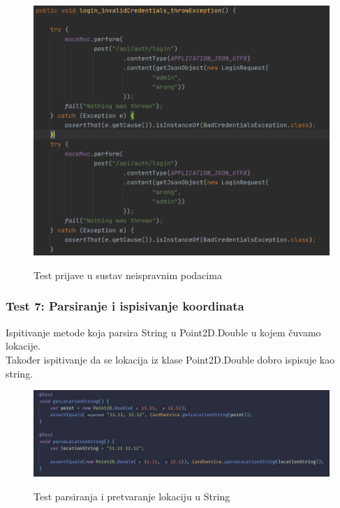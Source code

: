			\begin{figure}[H]
				\centering
				\includegraphics[scale=0.75]{slike/test6} \\
				\caption{ Test prijave u sustav neispravnim podacima}
				\label{fig:test6}
			\end{figure}
		
			\eject
		
			\subsubsection{Test 7: Parsiranje i ispisivanje koordinata}
			Ispitivanje metode koja parsira String u Point2D.Double u kojem čuvamo lokacije. \\
			Također ispitivanje da se lokacija iz klase Point2D.Double dobro ispisuje kao string.
		
			\begin{figure}[H]
				\centering
				\includegraphics[scale=0.65]{slike/test7} \\
				\caption{ Test parsiranja i pretvaranje lokaciju u String }
				\label{fig:test7}
			\end{figure}
		
